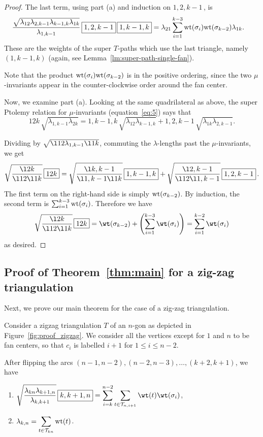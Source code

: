 \begin{proof}
 The last term, using part (a) and induction on $\boxed{1,2,k-1}$\,, is
 \begin{align*}
 \frac{\sqrt{\lambda_{12}\lambda_{2,k-1}\lambda_{k-1,k}\lambda_{1k}}}{\lambda_{1,k-1}} \, \boxed{1,2,k-1} \, \boxed{1,k-1,k}
 &= \lambda_{21} \sum_{i=1}^{k-3} {\rm wt}(\sigma_i) {\rm wt}(\sigma_{k-2}) \lambda_{1k}.
 \end{align*}
 These are the weights of the super $T$-paths which use the last triangle, namely $(1,k-1,k)$ (again, see Lemma~\ref{lm:super-path-single-fan}).

 Note that the product ${\rm wt}(\sigma_i) {\rm wt}(\sigma_{k-2})$ is in the positive ordering,
 since the two $\mu$-invariants appear in the counter-clockwise order around the fan center.

 Now, we examine part (a). Looking at the same quadrilateral as above, the super Ptolemy relation for $\mu$-invariants (equation~\eqref{eq:5}) says that
 \[ \boxed{12k} \, \sqrt{\lambda_{1,k-1}\lambda_{2k}} = \boxed{1,k-1,k} \, \sqrt{\lambda_{12}\lambda_{k-1,k}} + \boxed{1,2,k-1} \, \sqrt{\lambda_{1k}\lambda_{2,k-1}}. \]

 Dividing by $\sqrt{\l12\lambda_{1,k-1}\l1k}$, commuting the $\lambda$-lengths past the $\mu$-invariants, we get
 \[\sqrt{\l2k\over \l12\l1k }\, \boxed{12k}=\sqrt{\l k{,k-1} \over \l1{,k-1}\l1k }\,\boxed{1,k-1,k} + \sqrt{\l2{,k-1} \over\l12\l1{,k-1}}\,\boxed{1,2,k-1}\,.\]
 The first term on the right-hand side is simply ${\rm wt}(\sigma_{k-2})$. By induction, the second term is $\sum_{i=1}^{k-3} {\rm wt}(\sigma_i)$. Therefore we have
 \[\sqrt{\l2k\over \l12\l1k }\, \boxed{12k}=\wt(\sigma_{k-2}) + \left(\sum_{i=1}^{k-3}\wt(\sigma_i)\right)=\sum_{i=1}^{k-2}\wt(\sigma_{i})\]
 as desired.
\end{proof}

\subsection{Proof of Theorem~\ref{thm:main} for a zig-zag triangulation}

Next, we prove our main theorem for the case of a zig-zag triangulation.

\begin{Theorem} \label{thm:proof_zigzag}
 Consider a zigzag triangulation $T$ of an $n$-gon as depicted in Figure~{\rm \ref{fig:proof_zigzag}}. We consider all the vertices
 except for $1$ and $n$ to be fan centers, so that $c_{i}$ is labelled $i+1$ for $1\leq i\leq n-2$.

 After flipping the arcs $(n-1,n-2),(n-2,n-3),\dots,(k+2,k+1)$, we have
 \begin{enumerate}\itemsep=0pt
 \item[$(a)$] $\displaystyle \sqrt{\lambda_{kn}\lambda_{k+1,n}\over\lambda_{k,k+1}} \, \boxed{k,k+1,n} = \sum_{i=k}^{n-2} \sum_{t\in\mathcal T_{n,i+1}} \wt(t) \wt(\sigma_i)$,
 \item[$(b)$] $\displaystyle \lambda_{k,n} = \sum_{t \in \mathcal{T}_{kn}} {\rm wt}(t)$.
 \end{enumerate}
\end{Theorem}


